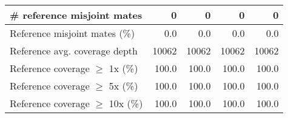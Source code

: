 \documentclass[12pt,a4paper]{article}
\begin{document}
\begin{table}[ht]
\begin{center}
\begin{tabular}{|l*{4}{|r}|}
\# reference misjoint mates & 0 & 0 & 0 & 0 \\ \hline
Reference misjoint mates (\%) & 0.0 & 0.0 & 0.0 & 0.0 \\ \hline
Reference avg. coverage depth & 10062 & 10062 & 10062 & 10062 \\ \hline
Reference coverage $\geq$ 1x (\%) & 100.0 & 100.0 & 100.0 & 100.0 \\ \hline
Reference coverage $\geq$ 5x (\%) & 100.0 & 100.0 & 100.0 & 100.0 \\ \hline
Reference coverage $\geq$ 10x (\%) & 100.0 & 100.0 & 100.0 & 100.0 \\ \hline
\end{tabular}
\end{center}
\end{table}
\end{document}
